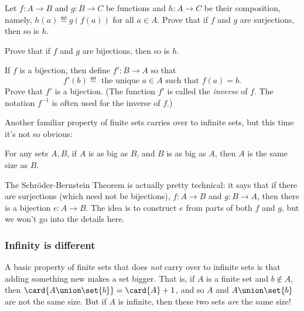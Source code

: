 \begin{notesproblem}
  Let $f:A \to B$ and $g: B \to C$ be functions and $h:A \to C$ be their
  composition, namely, $h(a) \eqdef g(f(a))$ for all $a \in A$.
\bparts
  \ppart Prove that if $f$ and $g$ are surjections, then so is $h$.

  \ppart Prove that if $f$ and $g$ are bijections, then so is $h$.

  \ppart If $f$ is a bijection, then define $f':B \to A$ so that
  \[
  f'(b) \eqdef\text{ the unique } a \in A \text{ such that } f(a)=b.
  \]
  Prove that $f'$ is a bijection.  (The function $f'$ is called the
  \emph{inverse} of $f$.  The notation $f^{-1}$ is often used for the
  inverse of $f$.)
\eparts
\end{notesproblem}

Another familiar property of finite sets carries over to infinite sets,
but this time it's not so obvious:
\begin{theorem}  For any sets $A,B$, if $A$ is as
  big as $B$, and $B$ is as big as $A$, then $A$ is the same size as
  $B$.
\end{theorem}
The Schr\"oder-Bernstein Theorem is actually pretty technical: it says
that if there are surjections (which need not be bijections), $f:A\to B$
and $g:B \to A$, then there is a bijection $e:A \to B$.  The idea is to
construct $e$ from parts of both $f$ and $g$, but we won't go into the
details here.

\subsubsection{Infinity is different}

A basic property of finite sets that does \emph{not} carry over to
infinite sets is that adding something new makes a set bigger.  That is,
if $A$ is a finite set and $b \notin A$, then $\card{A \union \set{b}} =
\card{A}+1$, and so $A$ and $A \union \set{b}$ are not the same size.  But
if $A$ is infinite, then these two sets \emph{are} the same size!

